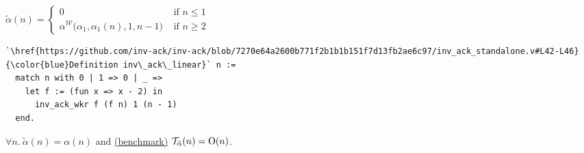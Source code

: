%
\begin{defn} \label{defn: inv-ack-hardcode}
	$\tilde{\alpha}(n) = \begin{cases}
	0 & \text{ if } n \le 1 \\ \alpha^{\mathcal{W}}\big(\alpha_1, \alpha_1(n), 1, n-1\big) & \text{ if } n \ge 2
	\end{cases}$
\end{defn}

\begin{lstlisting}
`\href{https://github.com/inv-ack/inv-ack/blob/7270e64a2600b771f2b1b1b151f7d13fb2ae6c97/inv_ack_standalone.v#L42-L46}{\color{blue}Definition inv\_ack\_linear}` n :=
  match n with 0 | 1 => 0 | _ => 
    let f := (fun x => x - 2) in
      inv_ack_wkr f (f n) 1 (n - 1)
  end.
\end{lstlisting}

\begin{thm} \label{thm: inv-ack-hardcode-correct}
	\href{https://github.com/inv-ack/inv-ack/blob/7270e64a2600b771f2b1b1b151f7d13fb2ae6c97/inv_ack.v#L329-L337}{\color{blue}\coq}
	$\forall n.~\tilde{\alpha}(n) = \alpha(n)$
	\; and \hfill\break 
	\href{https://github.com/inv-ack/inv-ack/blob/7270e64a2600b771f2b1b1b151f7d13fb2ae6c97/test_runtime_ocaml.ml#L99-L104}{\hspace{6.1em}\color{blue}\coq (benchmark)}
	$\mathcal{T}_{\tilde{\alpha}}(n) = \text{O}(n)$.
\end{thm}

